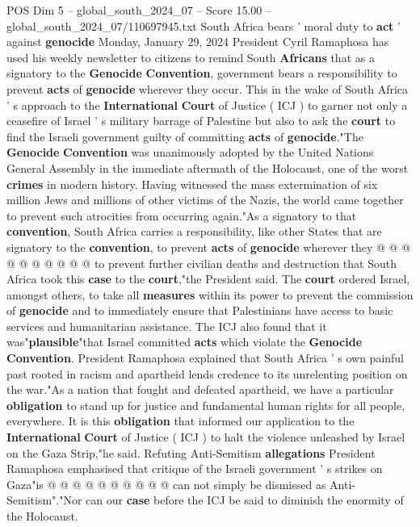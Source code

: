 \begin{textsample}{POS Dim 5 – global\_south\_2024\_07 – Score 15.00 – global\_south\_2024\_07/110697945.txt}  \label{ex:f5_pos_168}
South Africa bears ' moral duty to \textbf{act} ' against \textbf{genocide} Monday, January 29, 2024 President Cyril Ramaphosa has used his weekly newsletter to citizens to remind South \textbf{Africans} that as a signatory to the \textbf{Genocide} \textbf{Convention}, government bears a responsibility to prevent \textbf{acts} of \textbf{genocide} wherever they occur.
This in the wake of South Africa ' s approach to the \textbf{International} \textbf{Court} of Justice ( ICJ ) to garner not only a ceasefire of Israel ' s military barrage of Palestine but also to ask the \textbf{court} to find the Israeli government guilty of committing \textbf{acts} of \textbf{genocide}."The \textbf{Genocide} \textbf{Convention} was unanimously adopted by the United Nations General Assembly in the immediate aftermath of the Holocaust, one of the worst \textbf{crimes} in modern history.
Having witnessed the mass extermination of six million Jews and millions of other victims of the Nazis, the world came together to prevent such atrocities from occurring again."As a signatory to that \textbf{convention}, South Africa carries a responsibility, like other States that are signatory to the \textbf{convention}, to prevent \textbf{acts} of \textbf{genocide} wherever they @ @ @ @ @ @ @ @ @ @ to prevent further civilian deaths and destruction that South Africa took this \textbf{case} to the \textbf{court},"the President said.
The \textbf{court} ordered Israel, amongst others, to take all \textbf{measures} within its power to prevent the commission of \textbf{genocide} and to immediately ensure that Palestinians have access to basic services and humanitarian assistance.
The ICJ also found that it was"\textbf{plausible}"that Israel committed \textbf{acts} which violate the \textbf{Genocide} \textbf{Convention}.
President Ramaphosa explained that South Africa ' s own painful past rooted in racism and apartheid lends credence to its unrelenting position on the war."As a nation that fought and defeated apartheid, we have a particular \textbf{obligation} to stand up for justice and fundamental human rights for all people, everywhere.
It is this \textbf{obligation} that informed our application to the \textbf{International} \textbf{Court} of Justice ( ICJ ) to halt the violence unleashed by Israel on the Gaza Strip,"he said.
Refuting Anti-Semitism \textbf{allegations} President Ramaphosa emphasised that critique of the Israeli government ' s strikes on Gaza"is @ @ @ @ @ @ @ @ @ @ can not simply be dismissed as Anti-Semitism"."Nor can our \textbf{case} before the ICJ be said to diminish the enormity of the Holocaust.

\end{textsample}
